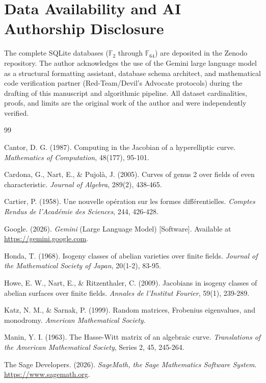 \documentclass[11pt,letterpaper]{article}
\begin{document}
\section{Data Availability and AI Authorship Disclosure}
The complete SQLite databases ($\mathbb{F}_{2}$ through $\mathbb{F}_{64}$) are deposited in the Zenodo repository. The author acknowledges the use of the Gemini large language model \cite{Gemini2026} as a structural formatting assistant, database schema architect, and mathematical code verification partner (Red-Team/Devil's Advocate protocols) during the drafting of this manuscript and algorithmic pipeline. All dataset cardinalities, proofs, and limits are the original work of the author and were independently verified.

\begin{thebibliography}{99}

Cantor, D. G. (1987). Computing in the Jacobian of a hyperelliptic curve. \textit{Mathematics of Computation}, 48(177), 95-101.

Cardona, G., Nart, E., \& Pujolà, J. (2005). Curves of genus 2 over fields of even characteristic. \textit{Journal of Algebra}, 289(2), 438-465.

Cartier, P. (1958). Une nouvelle op\'{e}ration sur les formes diff\'{e}rentielles. \textit{Comptes Rendus de l'Acad\'{e}mie des Sciences}, 244, 426-428.

Google. (2026). \textit{Gemini} (Large Language Model) [Software]. Available at \url{https://gemini.google.com}.

Honda, T. (1968). Isogeny classes of abelian varieties over finite fields. \textit{Journal of the Mathematical Society of Japan}, 20(1-2), 83-95.

Howe, E. W., Nart, E., \& Ritzenthaler, C. (2009). Jacobians in isogeny classes of abelian surfaces over finite fields. \textit{Annales de l'Institut Fourier}, 59(1), 239-289.

Katz, N. M., \& Sarnak, P. (1999). Random matrices, Frobenius eigenvalues, and monodromy. \textit{American Mathematical Society}.

Manin, Y. I. (1963). The Hasse-Witt matrix of an algebraic curve. \textit{Translations of the American Mathematical Society}, Series 2, 45, 245-264.

The Sage Developers. (2026). \textit{SageMath, the Sage Mathematics Software System}. \url{https://www.sagemath.org}.


\end{thebibliography}
\end{document}
